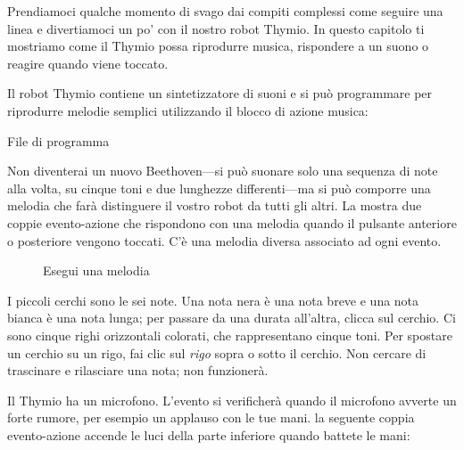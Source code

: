 
\label{ch.bells}

Prendiamoci qualche momento di svago dai compiti complessi come seguire una linea e
divertiamoci un po' con il nostro robot Thymio.
In questo capitolo ti mostriamo come il Thymio possa riprodurre musica, rispondere a un suono o reagire quando viene toccato.


Il robot Thymio contiene un sintetizzatore di suoni e si può programmare
per riprodurre melodie semplici utilizzando il blocco di azione musica: 

{\raggedleft \hfill File di programma }

Non diventerai un nuovo Beethoven---si può suonare solo una sequenza di note alla volta,
su cinque toni e due lunghezze differenti---ma si può comporre una
melodia che farà distinguere il vostro robot da tutti gli altri. La  mostra
due coppie evento-azione che rispondono con una melodia quando il pulsante anteriore o posteriore
vengono toccati. C'è una melodia diversa associato ad ogni evento.

\begin{figure}
\begin{center}
\caption{Esegui una melodia}\label{fig.music}
\end{center}
\end{figure}

I piccoli cerchi sono le sei note.
Una nota nera è una nota breve e una nota bianca è una nota lunga; per passare da una durata all'altra, clicca sul cerchio.
Ci sono cinque righi orizzontali colorati, che rappresentano cinque toni.
Per spostare un cerchio su un rigo, fai clic sul \emph{rigo} sopra o sotto il cerchio.
Non cercare di trascinare e rilasciare una nota; non funzionerà.




Il Thymio ha un microfono. L'evento  si verificherà
quando il microfono avverte un forte rumore, per esempio un applauso con le tue
mani. la seguente coppia evento-azione accende le luci della parte inferiore
quando battete le mani: 

